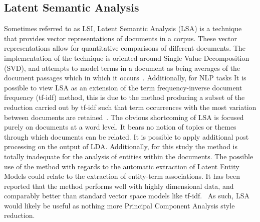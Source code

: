 \documentclass[10pt]{report}
\begin{document}
\subsection{Latent Semantic Analysis}
Sometimes referred to as LSI, Latent Semantic Analysis (LSA) is a technique that provides vector representations of documents in a corpus. These vector representations allow for quantitative comparisons of different documents. The implementation of the technique is oriented around Single Value Decomposition (SVD), and attempts to model terms in a document as being averages of the document passages which in which it occurs~\cite{Deerwester1989-yl}. Additionally, for NLP tasks It is possible to view LSA as an extension of the term frequency-inverse document frequency (tf-idf) method, this is due to the method producing a subset of the reduction carried out by tf-idf such that term occurrences with the most variation between documents are retained~\cite{Landauer1998-kx}.
The obvious shortcoming of LSA is focused purely on documents at a word level. It bears no notion of topics or themes through which documents can be related. It is possible to apply additional post processing on the output of LDA. Additionally, for this study the method is totally inadequate for the analysis of entities within the documents. The possible use of the method with regards to the automatic extraction of Latent Entity Models could relate to the extraction of entity-term associations. It has been reported that the method performs well with highly dimensional data, and comparably better than standard vector space models like tf-idf.~\cite{Kumar2004-da} As such, LSA would likely be useful as nothing more Principal Component Analysis style reduction.
\end{document}
